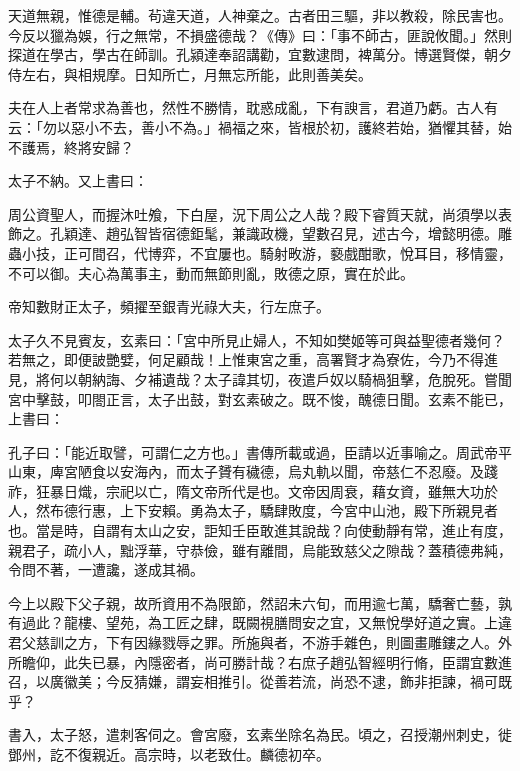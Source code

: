 \begin{pinyinscope}
 天道無親，惟德是輔。茍違天道，人神棄之。古者田三驅，非以教殺，除民害也。今反以獵為娛，行之無常，不損盛德哉？《傳》曰：「事不師古，匪說攸聞。」然則探道在學古，學古在師訓。孔潁達奉詔講勸，宜數逮問，裨萬分。博選賢傑，朝夕侍左右，與相規摩。日知所亡，月無忘所能，此則善美矣。



 夫在人上者常求為善也，然性不勝情，耽惑成亂，下有諛言，君道乃虧。古人有云：「勿以惡小不去，善小不為。」禍福之來，皆根於初，護終若始，猶懼其替，始不護焉，終將安歸？



 太子不納。又上書曰：



 周公資聖人，而握沐吐飧，下白屋，況下周公之人哉？殿下睿質天就，尚須學以表飾之。孔穎達、趙弘智皆宿德鉅髦，兼識政機，望數召見，述古今，增懿明德。雕蟲小技，正可間召，代博弈，不宜屢也。騎射畋游，褻戲酣歌，悅耳目，移情靈，不可以御。夫心為萬事主，動而無節則亂，敗德之原，實在於此。



 帝知數財正太子，頻擢至銀青光祿大夫，行左庶子。



 太子久不見賓友，玄素曰：「宮中所見止婦人，不知如樊姬等可與益聖德者幾何？若無之，即便詖艷嬖，何足顧哉！上惟東宮之重，高署賢才為寮佐，今乃不得進見，將何以朝納誨、夕補遺哉？太子諱其切，夜遣戶奴以騎楇狙擊，危脫死。嘗聞宮中擊鼓，叩閤正言，太子出鼓，對玄素破之。既不悛，醜德日聞。玄素不能已，上書曰：



 孔子曰：「能近取譬，可謂仁之方也。」書傳所載或過，臣請以近事喻之。周武帝平山東，庳宮陋食以安海內，而太子贇有穢德，烏丸軌以聞，帝慈仁不忍廢。及踐祚，狂暴日熾，宗祀以亡，隋文帝所代是也。文帝因周衰，藉女資，雖無大功於人，然布德行惠，上下安賴。勇為太子，驕肆敗度，今宮中山池，殿下所親見者也。當是時，自謂有太山之安，詎知壬臣敢進其說哉？向使動靜有常，進止有度，親君子，疏小人，黜浮華，守恭儉，雖有離間，烏能致慈父之隙哉？蓋積德弗純，令問不著，一遭讒，遂成其禍。



 今上以殿下父子親，故所資用不為限節，然詔未六旬，而用逾七萬，驕奢亡藝，孰有過此？龍樓、望苑，為工匠之肆，既闕視膳問安之宜，又無悅學好道之實。上違君父慈訓之方，下有因緣戮辱之罪。所施與者，不游手雜色，則圖畫雕鏤之人。外所瞻仰，此失已暴，內隱密者，尚可勝計哉？右庶子趙弘智經明行脩，臣謂宜數進召，以廣徽美；今反猜嫌，謂妄相推引。從善若流，尚恐不逮，飾非拒諫，禍可既乎？



 書入，太子怒，遣刺客伺之。會宮廢，玄素坐除名為民。頃之，召授潮州刺史，徙鄧州，訖不復親近。高宗時，以老致仕。麟德初卒。




\end{pinyinscope}
